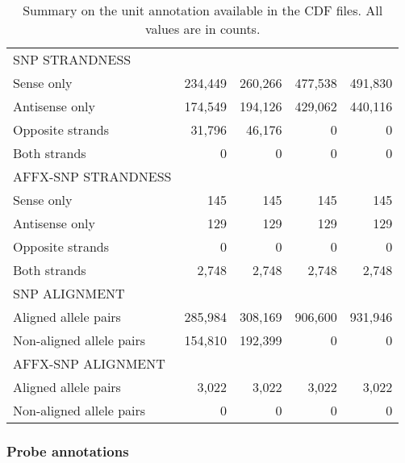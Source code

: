 \documentclass[10pt,a4paper]{article}
\begin{document}
\begin{table}[htp]
\begin{center}
\begin{tabular}{lrrrr}
\hline									            						             
SNP STRANDNESS					&	  				&	  				&	 				   &	 		     \\
Sense only              &  234,449  &  260,266  &   477,538 &    491,830 \\
Antisense only          &  174,549  &  194,126  &   429,062  &   440,116 \\
Opposite strands        &   31,796  &   46,176  &         0  &         0 \\
Both strands            &        0  &        0  &         0  &         0 \\
\hline									            						             
AFFX-SNP STRANDNESS 		&	  				&	  				&	 				   &	 		     \\
Sense only              &      145  &      145  &       145  &       145 \\
Antisense only          &      129  &      129  &       129  &       129 \\
Opposite strands        &        0  &        0  &         0  &         0 \\
Both strands            &    2,748  &    2,748  &     2,748  &     2,748 \\
\hline									            						             
SNP ALIGNMENT	           &	  			 &           &	 		      &	 		      \\
Aligned allele pairs     &  285,984  &  308,169  &   906,600  &   931,946 \\
Non-aligned allele pairs &  154,810  &  192,399  &         0  &         0 \\
\hline									            						             
AFFX-SNP ALIGNMENT	     &	  			 &	  				&	 		       &	 		      \\
Aligned allele pairs     &    3,022  &    3,022  &    3,022  &     3,022  \\
Non-aligned allele pairs &        0  &        0  &        0  &         0  \\
\hline									            						             
\end{tabular}
\end{center}
\caption{Summary on the unit annotation available in the CDF files.  All values are in counts.}  %
\label{tblCdfUnits}
\end{table}


\subsubsection{Probe annotations}
\end{document}
